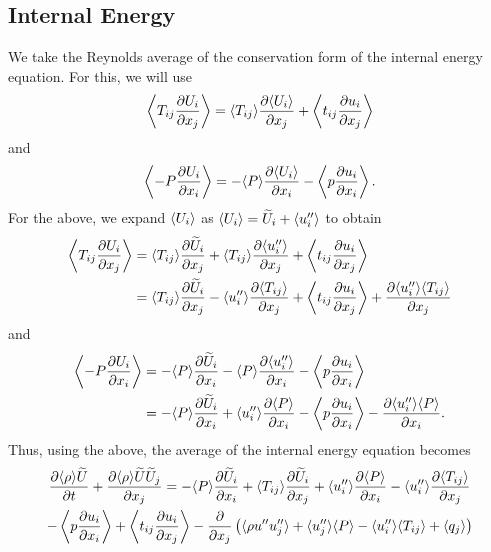 \documentclass[oneside,a4paper,11pt]{report}
\begin{document}
\subsection{Internal Energy}
We take the Reynolds average of the conservation form of the internal energy equation. For this, we will use
\begin{equation}
    \left < T_{ij} \frac{\partial U_i}{\partial x_j} \right > = \langle T_{ij} \rangle \frac{\partial \langle U_i \rangle}{\partial x_j} + \left < t_{ij} \frac{\partial u_i}{\partial x_j} \right >
\end{equation}
and
\begin{equation}
    \left < -P \frac{\partial U_i}{\partial x_i} \right > = -\langle P \rangle \frac{\partial \langle U_i \rangle}{\partial x_i} - \left < p \frac{\partial u_i}{\partial x_i} \right >.
\end{equation}
For the above, we expand $\langle U_i \rangle$ as $\langle U_i \rangle = \widetilde{U}_i + \langle u_i'' \rangle$ to obtain 
\begin{align}
    \left < T_{ij} \frac{\partial U_i}{\partial x_j} \right > &= \langle T_{ij} \rangle \frac{\partial \widetilde{U}_i}{\partial x_j} + \langle T_{ij} \rangle \frac{\partial \langle u_i'' \rangle}{\partial x_j} + \left < t_{ij} \frac{\partial u_i}{\partial x_j} \right > \nonumber \\
    &= \langle T_{ij} \rangle \frac{\partial \widetilde{U}_i}{\partial x_j} - \langle u_i'' \rangle \frac{\partial \langle T_{ij} \rangle}{\partial x_j} + \left < t_{ij} \frac{\partial u_i}{\partial x_j} \right > + \frac{\partial \langle u_i'' \rangle \langle T_{ij} \rangle}{\partial x_j}
\end{align}
and
\begin{align}
    \left < -P \frac{\partial U_i}{\partial x_i} \right > &= -\langle P \rangle \frac{\partial \widetilde{U}_i}{\partial x_i} - \langle P \rangle \frac{\partial \langle u_i'' \rangle}{\partial x_i} - \left < p \frac{\partial u_i}{\partial x_i} \right > \nonumber \\
    &= -\langle P \rangle \frac{\partial \widetilde{U}_i}{\partial x_i} + \langle u_i'' \rangle \frac{\partial \langle P \rangle}{\partial x_i} - \left < p \frac{\partial u_i}{\partial x_i} \right > - \frac{\partial \langle u_i'' \rangle \langle P \rangle}{\partial x_i}.
\end{align}
Thus, using the above, the average of the internal energy equation becomes
\begin{multline}
    \frac{\partial \langle \rho \rangle \widetilde{U}}{\partial t} + \frac{\partial \langle \rho \rangle \widetilde{U} \widetilde{U}_j}{\partial x_j} = -\langle P \rangle \frac{\partial \widetilde{U}_i}{\partial x_i} + \langle T_{ij} \rangle \frac{\partial \widetilde{U}_i}{\partial x_j} +\langle u_i'' \rangle \frac{\partial \langle P \rangle}{\partial x_i} - \langle u_i'' \rangle \frac{\partial \langle T_{ij} \rangle}{\partial x_j} \\
    - \left < p \frac{\partial u_i}{\partial x_i} \right > + \left < t_{ij} \frac{\partial u_i}{\partial x_j} \right > - \frac{\partial}{\partial x_j} \left ( \langle \rho u'' u_j'' \rangle +  \langle u_j'' \rangle \langle P \rangle - \langle u_i'' \rangle \langle T_{ij} \rangle + \left < q_j \right > \right)
\end{multline}
\end{document}
